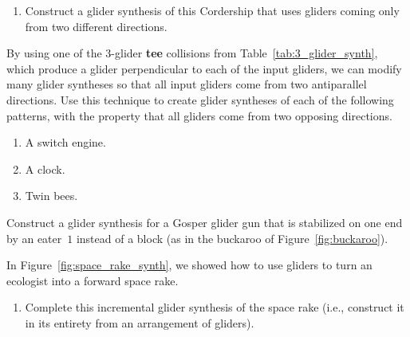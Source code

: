 \begin{multicols}{2}
\begin{problemstar}
\begin{enumerate}[label=\bf\color{ocre}(\alph*)]
			\item Construct a glider synthesis of this Cordership that uses gliders coming only from two different directions.
			
		\end{enumerate}
	\end{problemstar}
	
	
	\mfilbreak
	
	
	\begin{problemstar}\label{exer:glider_synth_tee} 
		By using one of the $3$-glider \textbf{tee} collisions from Table~\ref{tab:3_glider_synth}, which produce a glider perpendicular to each of the input gliders, we can modify many glider syntheses so that all input gliders come from two antiparallel directions. Use this technique to create glider syntheses of each of the following patterns, with the property that all gliders come from two opposing directions.\smallskip
		
		\begin{enumerate}[label=\bf\color{ocre}(\alph*)]
			\item A switch engine.
			
			\item A clock.
			
			\item Twin bees.
		\end{enumerate}
	\end{problemstar}
	
	
	\mfilbreak
	
	
	\begin{problem}\label{exer:ggg_stabilized_by_eater_synthesis} 
		Construct a glider synthesis for a Gosper glider gun that is stabilized on one end by an eater~$1$ instead of a block (as in the buckaroo of Figure~\ref{fig:buckaroo}).
	\end{problem}


	\mfilbreak
	
	
	\begin{problemstar}\label{exer:make_space_rake_synth} 
		In Figure~\ref{fig:space_rake_synth}, we showed how to use gliders to turn an ecologist into a forward space rake.\smallskip
		
		\begin{enumerate}[label=\bf\color{ocre}(\alph*)]
			\item Complete this incremental glider synthesis of the space rake (i.e., construct it in its entirety from an arrangement of gliders).
			

\end{enumerate}
\end{problemstar}
\end{multicols}
